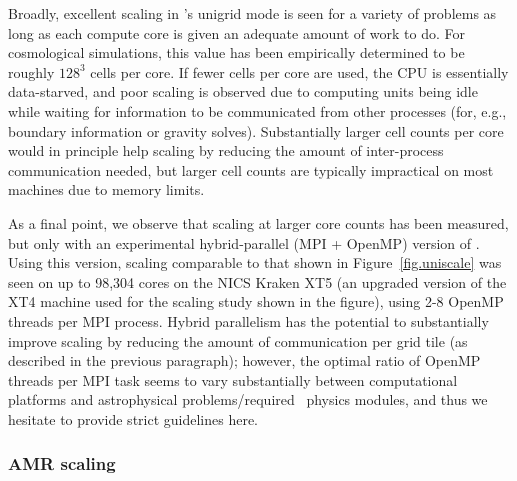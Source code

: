 Broadly, excellent scaling in \enzo's unigrid mode is seen for a
variety of problems as long as each compute core is given an adequate
amount of work to do.  For cosmological simulations, this value has
been empirically determined to be roughly $128^3$ cells per core.  If
fewer cells per core are used, the CPU is essentially data-starved,
and poor scaling is observed due to computing units being idle while
waiting for information to be communicated from other processes (for,
e.g., boundary information or gravity solves).  Substantially larger
cell counts per core would in principle help scaling by reducing the
amount of inter-process communication needed, but larger cell counts
are typically impractical on most machines due to memory limits.

As a final point, we observe that scaling at larger core counts has
been measured, but only with an experimental hybrid-parallel (MPI +
OpenMP) version of \enzo.  Using this version, scaling comparable to
that shown in Figure~\ref{fig.uniscale} was seen on up to 98,304 cores
on the NICS Kraken XT5 (an upgraded version of the XT4 machine used
for the scaling study shown in the figure), using 2-8 OpenMP threads
per MPI process.  Hybrid parallelism has the potential to
substantially improve scaling by reducing the amount of communication
per grid tile (as described in the previous paragraph); however, the
optimal ratio of OpenMP threads per MPI task seems to vary
substantially between computational platforms and astrophysical
problems/required \enzo\ physics modules, and thus we hesitate to
provide strict guidelines here.

\subsubsection{AMR scaling}

